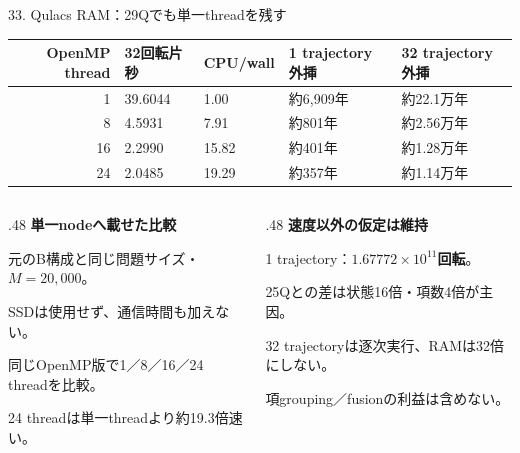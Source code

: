 \begin{frame}{33. Qulacs RAM：29Qでも単一threadを残す}
  \small
  \begin{tabularx}{\textwidth}{@{}rXXXX@{}}
    \toprule OpenMP thread & 32回転片 秒 & CPU/wall & 1 trajectory 外挿 & 32 trajectory 外挿 \\
    \midrule
    1 & 39.6044 & 1.00 & 約6,909年 & 約22.1万年 \\
    8 & 4.5931 & 7.91 & 約801年 & 約2.56万年 \\
    16 & 2.2990 & 15.82 & 約401年 & 約1.28万年 \\
    24 & 2.0485 & 19.29 & 約357年 & 約1.14万年 \\
    \bottomrule
  \end{tabularx}
  \medskip
  \begin{columns}[T,onlytextwidth]
    \begin{column}{.48\textwidth}
      \textbf{単一nodeへ載せた比較}\par
      \small 元のB構成と同じ問題サイズ・$M=20,000$。\par
      SSDは使用せず、通信時間も加えない。\par
      同じOpenMP版で1／8／16／24 threadを比較。\par
      24 threadは単一threadより約19.3倍速い。
    \end{column}
    \begin{column}{.48\textwidth}
      \textbf{速度以外の仮定は維持}\par
      \small 1 trajectory：\textbf{$1.67772\times10^{11}$回転}。\par
      25Qとの差は状態16倍・項数4倍が主因。\par
      32 trajectoryは逐次実行、RAMは32倍にしない。\par
      項grouping／fusionの利益は含めない。
    \end{column}
  \end{columns}
\end{frame}

